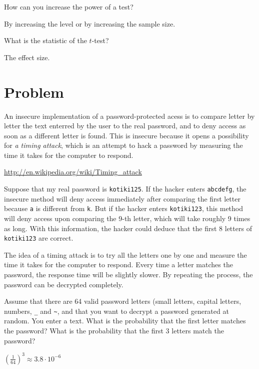 \documentclass[12pt]{article}
\begin{document}
\begin{Exercise}[label={exo4}]
  How can you increase the power of a test?
\end{Exercise}
\begin{Answer}[ref={exo4}]
  By increasing the level or by increasing the sample size.
\end{Answer}

\begin{Exercise}[label={exo5}]
  What is the statistic of the $t$-test?
\end{Exercise}
\begin{Answer}[ref={exo5}]
  The effect size.
\end{Answer}

\section{Problem}

  An insecure implementation of a password-protected acess
  is to compare letter by letter the text enterred by the
  user to the real password, and to deny access as soon
  as a different letter is found. This is insecure because
  it opens a possibility for \textit{a timing attack}, which
  is an attempt to hack a password by measuring the time it
  takes for the computer to respond.

  \url{http://en.wikipedia.org/wiki/Timing_attack}

  Suppose that my real password is \texttt{kotiki125}. If
  the hacker enters \texttt{abcdefg}, the insecure method will
  deny access immediately after comparing the first letter
  because \texttt{a} is different from  \texttt{k}. But
  if the hacker enters \texttt{kotiki123}, this method
  will deny access upon comparing the 9-th letter, which will
  take roughly 9 times as long. With this information, the
  hacker could deduce that the first 8 letters of
  \texttt{kotiki123} are correct.

  The idea of a timing attack is to try all the letters
  one by one and measure the time it takes for the computer
  to respond. Every time a letter matches the password, the
  response time will be slightly slower. By repeating the
  process, the password can be decrypted completely.

\begin{Exercise}[label={exo6}]
  Assume that there are 64 valid password letters
  (small letters, capital letters, numbers, \texttt{\_} and
  \texttt{\~}, and that you want to decrypt a password
  generated at random. You enter a text. What is the
  probability that the first letter matches the password?
  What is the probability that the first 3 letters match
  the password?
\end{Exercise}
\begin{Answer}[ref={exo6}]
  $\left(\frac{1}{64}\right)^3 \approx 3.8 \cdot 10^{-6}$
\end{Answer}
\end{document}
